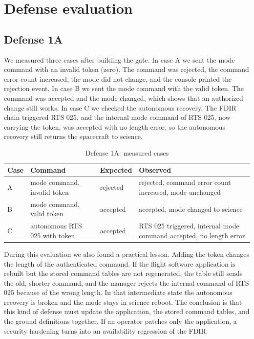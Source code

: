\documentclass[conference,letterpaper,10pt]{IEEEtran}
\begin{document}
\section{Defense evaluation}

\subsection{Defense 1A}
We measured three cases after building the gate. In case A we sent the mode command with an invalid token (zero). The command was rejected, the command error count increased, the mode did not change, and the console printed the rejection event. In case B we sent the mode command with the valid token. The command was accepted and the mode changed, which shows that an authorized change still works. In case C we checked the autonomous recovery. The FDIR chain triggered RTS 025, and the internal mode command of RTS 025, now carrying the token, was accepted with no length error, so the autonomous recovery still returns the spacecraft to science.

\begin{table}[t]
\caption{Defense 1A: measured cases}
\label{tab:def1a}
\centering
\footnotesize
\begin{tabular}{@{}p{5mm}p{22mm}p{14mm}p{24mm}@{}}
\toprule
Case & Command & Expected & Observed \\
\midrule
A & mode command, invalid token & rejected & rejected, command error count increased, mode unchanged \\
\addlinespace
B & mode command, valid token & accepted & accepted, mode changed to science \\
\addlinespace
C & autonomous RTS 025 with token & accepted & RTS 025 triggered, internal mode command accepted, no length error \\
\bottomrule
\end{tabular}
\end{table}

During this evaluation we also found a practical lesson. Adding the token changes the length of the authenticated command. If the flight software application is rebuilt but the stored command tables are not regenerated, the table still sends the old, shorter command, and the manager rejects the internal command of RTS 025 because of the wrong length. In that intermediate state the autonomous recovery is broken and the mode stays in science reboot. The conclusion is that this kind of defense must update the application, the stored command tables, and the ground definitions together. If an operator patches only the application, a security hardening turns into an availability regression of the FDIR.
\end{document}
